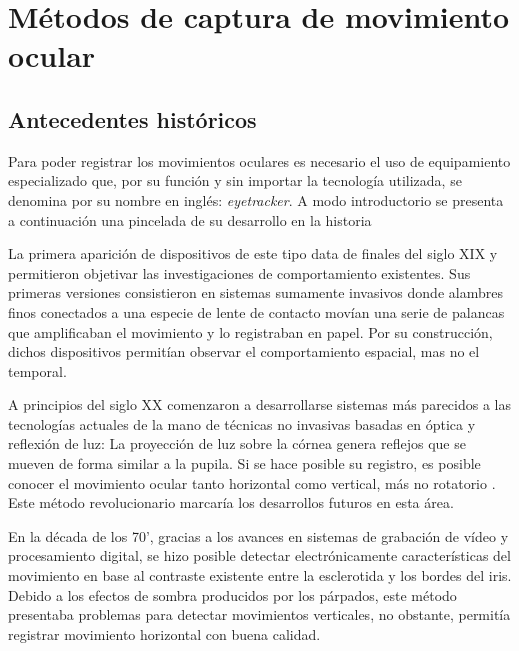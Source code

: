 \documentclass[../main.tex]{subfiles}
\begin{document}
	\section{Métodos de captura de movimiento ocular}
	\label{sub:02_metodos_de_captura}
		\subsection{Antecedentes históricos} 
		\label{sub:02_antecedentes_historicos}
			Para poder registrar los movimientos oculares es necesario el uso de equipamiento especializado que, por su función y sin importar la tecnología utilizada, se denomina por su nombre en inglés: \textit{\gls{eyetracker}}. A modo introductorio se presenta a continuación una pincelada de su desarrollo en la historia \cite{article:eyetracker_eggert, article:eyetracker_richardson}

			La primera aparición de dispositivos de este tipo data de finales del siglo XIX \cite{article:eyetracker_hist1, article:eyetracker_hist2} y permitieron objetivar las investigaciones de comportamiento existentes. Sus primeras versiones consistieron en sistemas sumamente invasivos donde alambres finos conectados a una especie de lente de contacto movían una serie de palancas que amplificaban el movimiento y lo registraban en papel. Por su construcción, dichos dispositivos permitían observar el comportamiento espacial, mas no el temporal. 

			A principios del siglo XX comenzaron a desarrollarse sistemas más parecidos a las tecnologías actuales de la mano de técnicas no invasivas basadas en óptica y reflexión de luz: La proyección de luz sobre la córnea genera reflejos que se mueven de forma similar a la pupila. Si se hace posible su registro, es posible conocer el movimiento ocular tanto horizontal como vertical, más no rotatorio \cite{article:eyetracker_hist3}. Este método revolucionario marcaría los desarrollos futuros en esta área.

			En la década de los 70', gracias a los avances en sistemas de grabación de vídeo y procesamiento digital, se hizo posible detectar electrónicamente características del movimiento en base al contraste existente entre la \gls{esclerotida} y los bordes del iris. Debido a los efectos de sombra producidos por los párpados, este método presentaba problemas para detectar movimientos verticales, no obstante, permitía registrar movimiento horizontal con buena calidad. 
\end{document}
